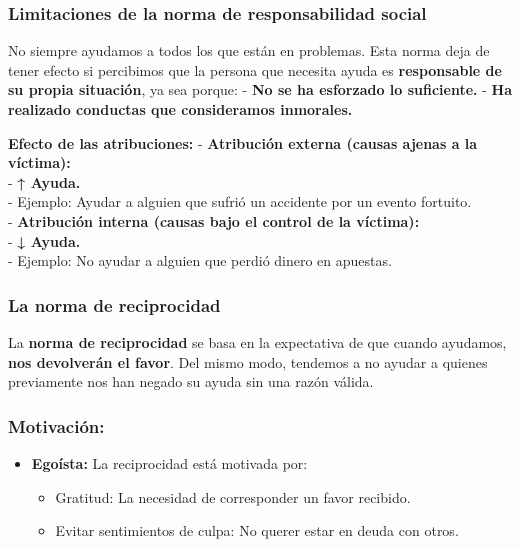\documentclass[
]{book}
\providecommand{\tightlist}{%
  \setlength{\itemsep}{0pt}\setlength{\parskip}{0pt}}
\begin{document}
\subsubsection{Limitaciones de la norma de responsabilidad social}\label{limitaciones-de-la-norma-de-responsabilidad-social}

No siempre ayudamos a todos los que están en problemas. Esta norma deja de tener efecto si percibimos que la persona que necesita ayuda es \textbf{responsable de su propia situación}, ya sea porque:
- \textbf{No se ha esforzado lo suficiente.}
- \textbf{Ha realizado conductas que consideramos inmorales.}

\textbf{Efecto de las atribuciones:}
- \textbf{Atribución externa (causas ajenas a la víctima):}\\
- \textbf{↑ Ayuda.}\\
- Ejemplo: Ayudar a alguien que sufrió un accidente por un evento fortuito.\\
- \textbf{Atribución interna (causas bajo el control de la víctima):}\\
- \textbf{↓ Ayuda.}\\
- Ejemplo: No ayudar a alguien que perdió dinero en apuestas.

\subsubsection{La norma de reciprocidad}\label{la-norma-de-reciprocidad}

La \textbf{norma de reciprocidad} se basa en la expectativa de que cuando ayudamos, \textbf{nos devolverán el favor}. Del mismo modo, tendemos a no ayudar a quienes previamente nos han negado su ayuda sin una razón válida.

\subsubsection{Motivación:}\label{motivaciuxf3n}

\begin{itemize}
\tightlist
\item
  \textbf{Egoísta:} La reciprocidad está motivada por:

  \begin{itemize}
  \tightlist
  \item
    Gratitud: La necesidad de corresponder un favor recibido.
  \item
    Evitar sentimientos de culpa: No querer estar en deuda con otros.
  \end{itemize}
\end{itemize}
\end{document}
